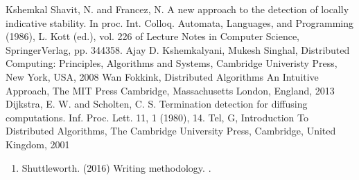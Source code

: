 \documentclass[letterpaper,10pt,english]{sphinxmanual}
\begin{document}
\begin{sphinxthebibliography}{Kshemkal}
\sphinxAtStartPar
Shavit, N. and Francez, N. A new approach to the detection of locally indicative stability. In proc. Int. Colloq. Automata, Languages, and Programming (1986), L. Kott (ed.), vol. 226 of Lecture Notes in Computer Science, Springer\sphinxhyphen{}Verlag, pp. 344\sphinxhyphen{}358.
\sphinxAtStartPar
Ajay D. Kshemkalyani, Mukesh Singhal, Distributed Computing: Principles, Algorithms and Systems, Cambridge Univeristy Press, New York, USA, 2008
\sphinxAtStartPar
Wan Fokkink, Distributed Algorithms An Intuitive Approach, The MIT Press Cambridge, Massachusetts London, England, 2013
\sphinxAtStartPar
Dijkstra, E. W. and Scholten, C. S. Termination detection for diffusing computations. Inf. Proc. Lett. 11, 1 (1980), 1\sphinxhyphen{}4.
\sphinxAtStartPar
Tel, G, Introduction To Distributed Algorithms, The Cambridge University Press, Cambridge, United Kingdom, 2001
\begin{enumerate}
%
\setcounter{enumi}{12}
\item {} 
\sphinxAtStartPar
Shuttleworth. (2016) Writing methodology. .

\end{enumerate}
\end{sphinxthebibliography}



\renewcommand{\indexname}{Index}
\printindex
\end{document}
